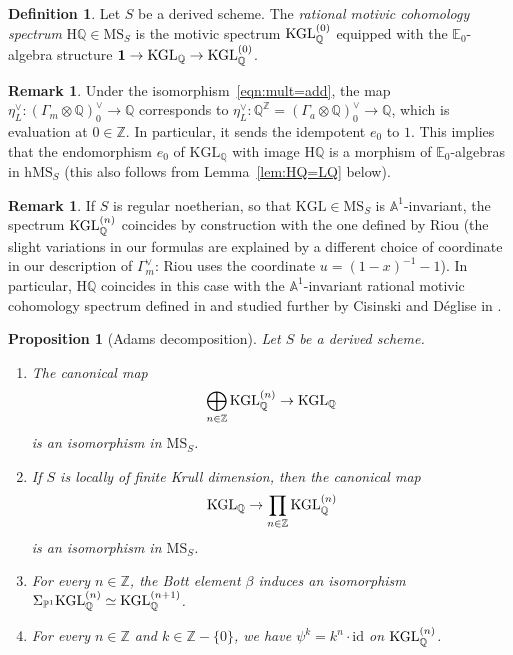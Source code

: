 \documentclass{amsart}
\numberwithin{equation}{section}
\theoremstyle{plain}
\newtheorem{proposition}[equation]{Proposition}
\theoremstyle{definition}
\newtheorem{definition}[equation]{Definition}
\newtheorem{remark}[equation]{Remark}
\let\bb=\mathbb
\def\Z{\bb Z}
\def\Q{\bb Q}
\def\A{\bb A}
\def\P{\bb P}
\def\1{\mathbf 1}
\def\h{\mathrm h}
\def\id{\mathrm{id}}
\def\HH{\mathrm{H}}
\def\E{\mathbb{E}}
\def\adams#1{{\smash[t]{(#1)}}}
\def\KGL{\mathrm{KGL}}
\def\MS{\mathrm{MS}}
\begin{document}
\begin{definition}\label{def:HQ}
	Let $S$ be a derived scheme.
	The \emph{rational motivic cohomology spectrum} $\HH\Q\in\MS_S$ is the motivic spectrum $\KGL_\Q^\adams{0}$ equipped with the $\E_0$-algebra structure $\1\to\KGL_\Q\to \KGL_\Q^\adams{0}$.
\end{definition}

\begin{remark}\label{rmk:E_0-retract}
	Under the isomorphism~\eqref{eqn:mult=add}, the map $\eta_L^\vee\colon (\Gamma_m\otimes\Q)^\vee_0\to \Q$ corresponds to $\eta_L^\vee\colon \Q^\Z=(\Gamma_a\otimes\Q)^\vee_0\to \Q$, which is evaluation at $0\in \Z$. In particular, it sends the idempotent $e_0$ to $1$. This implies that the endomorphism $e_0$ of $\KGL_\Q$ with image $\HH\Q$ is a morphism of $\E_0$-algebras in $\h\MS_S$ (this also follows from Lemma~\ref{lem:HQ=LQ} below).
\end{remark}

\begin{remark}
	If $S$ is regular noetherian, so that $\KGL\in\MS_S$ is $\A^1$-invariant, the spectrum $\KGL_\Q^\adams{n}$ coincides by construction with the one defined by Riou \cite[Definition 5.3.9]{RiouK} (the slight variations in our formulas are explained by a different choice of coordinate in our description of $\Gamma_m^\vee$: Riou uses the coordinate $u=(1-x)^{-1}-1$).
	In particular, $\HH\Q$ coincides in this case with the $\A^1$-invariant rational motivic cohomology spectrum defined in \cite[Definition 5.3.17]{RiouK} and studied further by Cisinski and Déglise in \cite[Section 14]{CD}.
\end{remark}

\begin{proposition}[Adams decomposition]
	\label{prop:Adams-dec}
	Let $S$ be a derived scheme.
	\begin{enumerate}
	\item The canonical map
	\[
	\bigoplus_{n\in \Z}\KGL_\Q^\adams{n} \to \KGL_\Q
	\]
	is an isomorphism in $\MS_S$.
	\item If $S$ is locally of finite Krull dimension, then the canonical map
	\[
	\KGL_\Q\to \prod_{n\in \Z}\KGL_\Q^\adams{n}
	\]
	is an isomorphism in $\MS_S$.
	\item For every $n\in \Z$, the Bott element $\beta$ induces an isomorphism $\Sigma_{\P^1}\KGL_\Q^\adams{n}\simeq\KGL_\Q^\adams{n+1}$.
	\item For every $n\in \Z$ and $k\in\Z-\{0\}$, we have $\psi^k=k^n\cdot\id$ on $\KGL_\Q^\adams{n}$.
	\end{enumerate}
\end{proposition}
\end{document}
